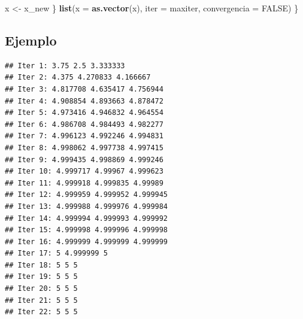 \documentclass[
]{book}
\newenvironment{Shaded}{\begin{snugshade}}{\end{snugshade}}
\newcommand{\AttributeTok}[1]{\textcolor[rgb]{0.13,0.29,0.53}{#1}}
\newcommand{\ConstantTok}[1]{\textcolor[rgb]{0.56,0.35,0.01}{#1}}
\newcommand{\DecValTok}[1]{\textcolor[rgb]{0.00,0.00,0.81}{#1}}
\newcommand{\FloatTok}[1]{\textcolor[rgb]{0.00,0.00,0.81}{#1}}
\newcommand{\FunctionTok}[1]{\textcolor[rgb]{0.13,0.29,0.53}{\textbf{#1}}}
\newcommand{\NormalTok}[1]{#1}
\newcommand{\OtherTok}[1]{\textcolor[rgb]{0.56,0.35,0.01}{#1}}
\newcommand{\SpecialCharTok}[1]{\textcolor[rgb]{0.81,0.36,0.00}{\textbf{#1}}}
\begin{document}
\begin{Shaded}
\begin{Highlighting}[]
\NormalTok{    x }\OtherTok{\textless{}{-}}\NormalTok{ x\_new}
\NormalTok{  \}}
  \FunctionTok{list}\NormalTok{(}\AttributeTok{x =} \FunctionTok{as.vector}\NormalTok{(x), }\AttributeTok{iter =}\NormalTok{ maxiter, }\AttributeTok{convergencia =} \ConstantTok{FALSE}\NormalTok{)}
\NormalTok{\}}
\end{Highlighting}
\end{Shaded}

\subsection{Ejemplo}\label{ejemplo-9}

\begin{Shaded}
\end{Shaded}

\begin{verbatim}
## Iter 1: 3.75 2.5 3.333333
## Iter 2: 4.375 4.270833 4.166667
## Iter 3: 4.817708 4.635417 4.756944
## Iter 4: 4.908854 4.893663 4.878472
## Iter 5: 4.973416 4.946832 4.964554
## Iter 6: 4.986708 4.984493 4.982277
## Iter 7: 4.996123 4.992246 4.994831
## Iter 8: 4.998062 4.997738 4.997415
## Iter 9: 4.999435 4.998869 4.999246
## Iter 10: 4.999717 4.99967 4.999623
## Iter 11: 4.999918 4.999835 4.99989
## Iter 12: 4.999959 4.999952 4.999945
## Iter 13: 4.999988 4.999976 4.999984
## Iter 14: 4.999994 4.999993 4.999992
## Iter 15: 4.999998 4.999996 4.999998
## Iter 16: 4.999999 4.999999 4.999999
## Iter 17: 5 4.999999 5
## Iter 18: 5 5 5
## Iter 19: 5 5 5
## Iter 20: 5 5 5
## Iter 21: 5 5 5
## Iter 22: 5 5 5
\end{verbatim}
\end{document}
